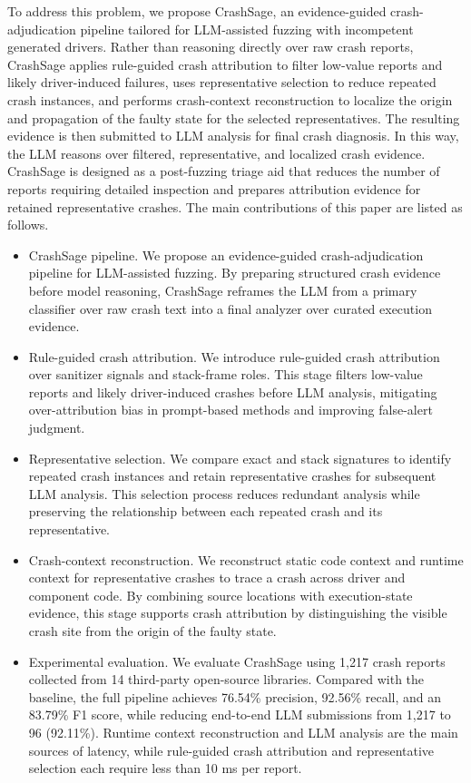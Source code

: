 \documentclass[pdflatex,sn-basic]{sn-jnl}%
\theoremstyle{thmstyleone}%
\theoremstyle{thmstyletwo}%
\theoremstyle{thmstylethree}%
\begin{document}
To address this problem, we propose CrashSage, an evidence-guided crash-adjudication pipeline tailored for LLM-assisted fuzzing with incompetent generated drivers. Rather than reasoning directly over raw crash reports, CrashSage applies rule-guided crash attribution to filter low-value reports and likely driver-induced failures, uses representative selection to reduce repeated crash instances, and performs crash-context reconstruction to localize the origin and propagation of the faulty state for the selected representatives. The resulting evidence is then submitted to LLM analysis for final crash diagnosis. In this way, the LLM reasons over filtered, representative, and localized crash evidence. CrashSage is designed as a post-fuzzing triage aid that reduces the number of reports requiring detailed inspection and prepares attribution evidence for retained representative crashes. The main contributions of this paper are listed as follows.

\begin{itemize}
    \item CrashSage pipeline. We propose an evidence-guided crash-adjudication pipeline for LLM-assisted fuzzing. By preparing structured crash evidence before model reasoning, CrashSage reframes the LLM from a primary classifier over raw crash text into a final analyzer over curated execution evidence.
    \item Rule-guided crash attribution. We introduce rule-guided crash attribution over sanitizer signals and stack-frame roles. This stage filters low-value reports and likely driver-induced crashes before LLM analysis, mitigating over-attribution bias in prompt-based methods and improving false-alert judgment.
    \item Representative selection. We compare exact and stack signatures to identify repeated crash instances and retain representative crashes for subsequent LLM analysis. This selection process reduces redundant analysis while preserving the relationship between each repeated crash and its representative.
    \item Crash-context reconstruction. We reconstruct static code context and runtime context for representative crashes to trace a crash across driver and component code. By combining source locations with execution-state evidence, this stage supports crash attribution by distinguishing the visible crash site from the origin of the faulty state.
    \item Experimental evaluation. We evaluate CrashSage using {\color{blue}1,217} crash reports collected from {\color{blue}14} third-party open-source libraries. Compared with the baseline, the full pipeline achieves {\color{blue}76.54\%} precision, {\color{blue}92.56\%} recall, and an {\color{blue}83.79\%} F1 score, while reducing end-to-end LLM submissions from {\color{blue}1,217} to {\color{blue}96} ({\color{blue}92.11\%}). Runtime context reconstruction and LLM analysis are the main sources of latency, while rule-guided crash attribution and representative selection each require less than 10 ms per report.
\end{itemize}
\end{document}
